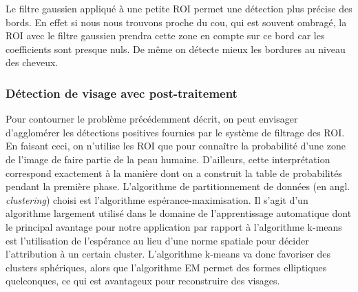 \documentclass[a4paper,11pt]{article}
\begin{document}
Le filtre gaussien appliqué à une petite ROI permet une détection plus précise
des bords. En effet si nous nous trouvons proche du cou, qui est souvent
ombragé, la ROI avec le filtre gaussien prendra cette zone en compte sur ce
bord car les coefficients sont presque nuls. De même on détecte mieux les
bordures au niveau des cheveux.
\subsubsection{Détection de visage avec post-traitement}
Pour contourner le problème précédemment décrit, on peut envisager d'agglomérer les détections positives fournies par le système de filtrage des ROI.
En faisant ceci, on n'utilise les ROI que pour connaître la probabilité d'une zone de l'image de faire partie de la peau humaine.
D'ailleurs, cette interprétation correspond exactement à la manière dont on a construit la table de probabilités pendant la première phase.
\newline
\newline
L'algorithme de partitionnement de données (en angl. {\textit{clustering}}) choisi est l'algorithme espérance-maximisation.
Il s'agit d'un algorithme largement utilisé dans le domaine de l'apprentissage automatique dont le principal avantage pour notre application par rapport à l'algorithme k-means est l'utilisation de l'espérance au lieu d'une norme spatiale pour décider l'attribution à un certain cluster.
L'algorithme k-means va donc favoriser des clusters sphériques, alors que l'algorithme EM permet des formes elliptiques quelconques, ce qui est avantageux pour reconstruire des visages.\\
\newline
\end{document}
